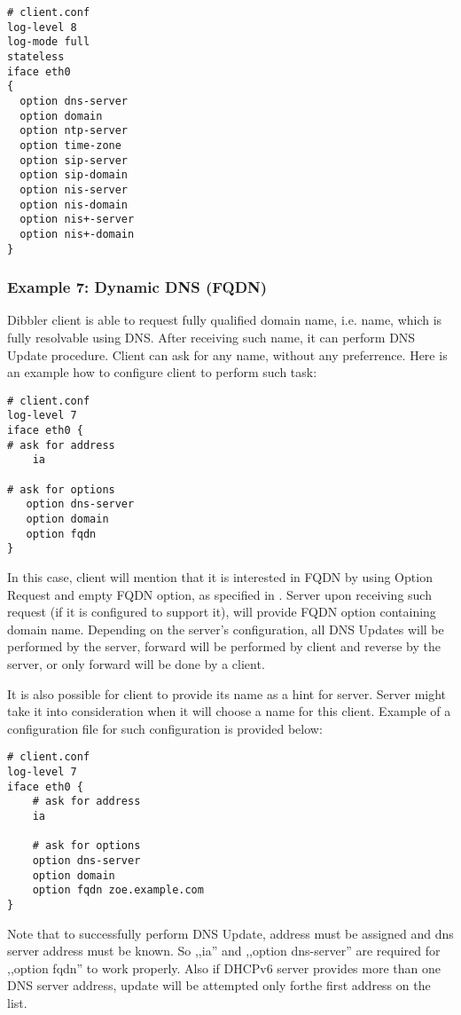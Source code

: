 \begin{lstlisting}
# client.conf
log-level 8
log-mode full
stateless
iface eth0
{
  option dns-server
  option domain
  option ntp-server
  option time-zone
  option sip-server
  option sip-domain
  option nis-server
  option nis-domain
  option nis+-server
  option nis+-domain
}
\end{lstlisting}

\subsubsection{Example 7: Dynamic DNS (FQDN)}
\label{example-client-fqdn}
Dibbler client is able to request fully qualified domain name,
i.e. name, which is fully resolvable using DNS. After receiving such
name, it can perform DNS Update procedure. Client can ask for any
name, without any preferrence. Here is an example how to configure
client to perform such task:
\begin{lstlisting}
# client.conf
log-level 7
iface eth0 {
# ask for address
    ia

# ask for options
   option dns-server
   option domain
   option fqdn
}
\end{lstlisting}

In this case, client will mention that it is interested in FQDN by
using Option Request and empty FQDN option, as specified in
\cite{rfc4704}. Server upon receiving such request (if it is
configured to support it), will provide FQDN option containing domain
name. Depending on the server's configuration, all DNS Updates will be
performed by the server, forward will be performed by client and reverse
by the server, or only forward will be done by a client.

It is also possible for client to provide its name as a hint for
server. Server might take it into consideration when it will choose a
name for this client. Example of a configuration file for such
configuration is provided below:

\begin{lstlisting}
# client.conf
log-level 7
iface eth0 {
    # ask for address
    ia

    # ask for options
    option dns-server
    option domain
    option fqdn zoe.example.com
}
\end{lstlisting}

Note that to successfully perform DNS Update, address must be assigned
and dns server address must be known. So ,,ia'' and ,,option
dns-server'' are required for ,,option fqdn'' to work properly. Also if
DHCPv6 server provides more than one DNS server address, update will
be attempted only forthe first address on the list.


